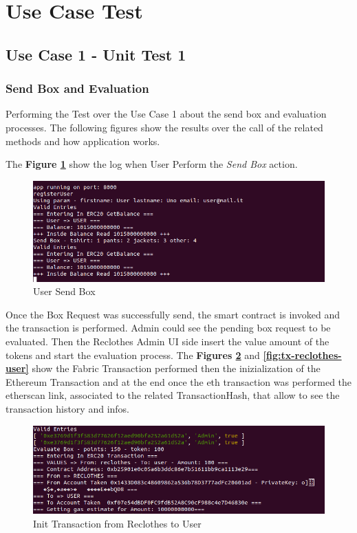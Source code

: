\section{Use Case Test}

\subsection{Use Case 1 - Unit Test 1}

\subsubsection{Send Box and Evaluation}

Performing the Test over the Use Case 1 about the send box and evaluation processes. The following
figures show the results over the call of the related methods and how application works. 

The \textbf{Figure \ref{fig:user-send-box}} show the log when User Perform the \textit{Send Box} action.

\begin{figure}[h!]
	\centering
    \includegraphics[totalheight=4cm]{img/test/test1/user-send-box.png}
	\caption{User Send Box}
	\label{fig:user-send-box}
\end{figure}

Once the Box Request was successfully send, the smart contract is invoked and the transaction is 
performed. Admin could see the pending box request to be evaluated. Then the Reclothes Admin UI side
insert the value amount of the tokens and start the evaluation process.
\newline
The \textbf{Figures \ref{fig:init-tx-reclothes-user}} and \textbf{\ref{fig:tx-reclothes-user}} 
show the Fabric Transaction performed then the inizialization of the Ethereum Transaction
and at the end once the eth transaction was performed the etherscan link, associated to the 
related TransactionHash, that allow to see the transaction history and infos.

\begin{figure}[h!]
	\centering
    \includegraphics[totalheight=4cm]{img/test/test1/init-tx-RU.png}
	\caption{Init Transaction from Reclothes to User}
	\label{fig:init-tx-reclothes-user}
\end{figure}

